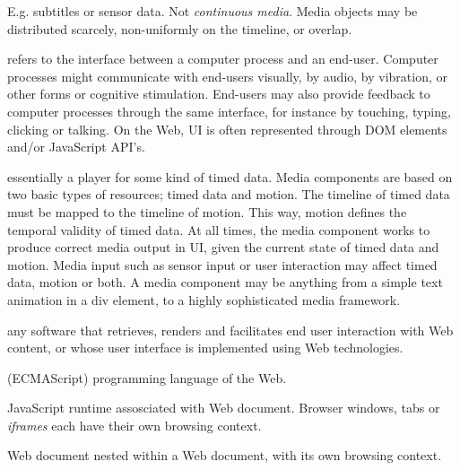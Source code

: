 E.g. subtitles or sensor data. Not \emph{continuous media}.
Media objects may be distributed scarcely, non-uniformly on the
timeline, or overlap.


refers to the interface between a computer process and an end-user. Computer
processes might communicate with end-users visually, by audio, by vibration,
or other forms or cognitive stimulation. End-users may also provide feedback
to computer processes through the same interface, for instance by touching,
typing, clicking or talking. On the Web, UI is often represented through DOM
elements and/or JavaScript API’s.


essentially a player for some kind of timed data. Media components are based
on two basic types of resources; timed data and motion. The timeline of timed
data must be mapped to the timeline of motion. This way, motion defines the
temporal validity of timed data. At all times, the media component works to
produce correct media output in UI, given the current state of timed data and
motion. Media input such as sensor input or user interaction may affect timed
data, motion or both. A media component may be anything from a simple text
animation in a div element, to a highly sophisticated media framework.


any software that retrieves, renders and facilitates end user interaction with
Web content, or whose user interface is implemented using Web technologies.


(ECMAScript) programming language of the Web. 


JavaScript runtime assosciated with Web document. Browser windows, tabs or
\emph{iframes} each have their own browsing context.


Web document nested within a Web document, with its own browsing context.
